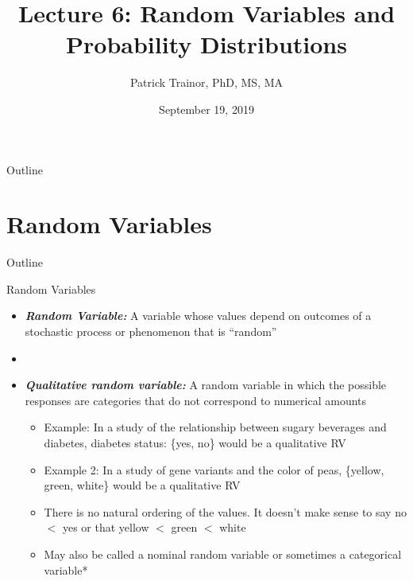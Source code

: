 \documentclass[xcolor=dvipsnames]{beamer}
\title[Lecture 6]{Lecture 6: Random Variables and Probability Distributions}
\author[Patrick Trainor]{Patrick Trainor, PhD, MS, MA}
\institute[NMSU]{New Mexico State University}
\date{September 19, 2019}
\begin{document}
\begin{frame}
	\maketitle
\end{frame}

\begin{frame}{Outline}
	\tableofcontents[hideallsubsections]
\end{frame}

\section{Random Variables}
\begin{frame}{Outline}
	\tableofcontents[currentsection,subsectionstyle=show/shaded/hide]
\end{frame}

\begin{frame}{Random Variables}
	\begin{itemize}
		\item \textbf{\emph{Random Variable:}} A variable whose values depend on outcomes of a stochastic process or phenomenon that is ``random'' \pause
		\item[]
		\item \textbf{\emph{Qualitative random variable:}} A random variable in which the possible responses are categories that do not correspond to numerical amounts \pause
		\begin{itemize}
			\item Example: In a study of the relationship between sugary beverages and diabetes, diabetes status: \{yes, no\} would be a qualitative RV \pause
			\item Example 2: In a study of gene variants and the color of peas, \{yellow, green, white\} would be a qualitative RV \pause
			\item There is no natural ordering of the values. It doesn't make sense to say no $<$ yes or that yellow $<$ green $<$ white \pause
			\item May also be called a nominal random variable or sometimes a categorical variable*
		\end{itemize}
	\end{itemize}
\end{frame}
\end{document}
